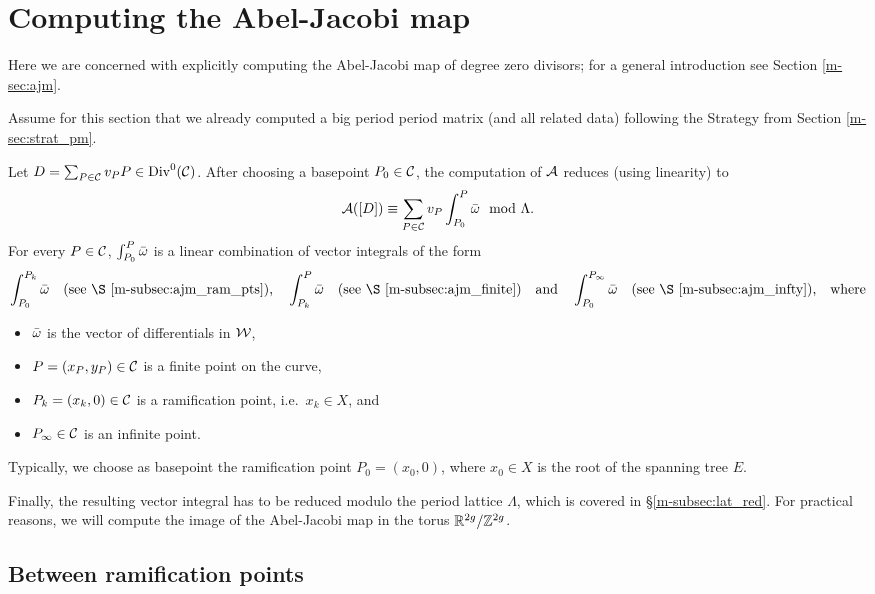 \documentclass[main.tex]{subfiles}
\begin{document}
  \section{Computing the Abel-Jacobi map}\label{sec:comp_ajm}
  
   Here we are concerned with explicitly computing the Abel-Jacobi map of degree zero divisors; for a general introduction see Section \ref{m-sec:ajm}.
   
   Assume for this section that we already computed a big period period matrix (and all related data) following the Strategy from Section \ref{m-sec:strat_pm}. 
   
   Let $D = \sum_{P \in \mathcal{C}} v_P P \in \operatorname{Div}^0(\mathcal{C})$. After choosing a basepoint $P_0 \in \mathcal{C}$, the computation of $\mathcal{A}$ reduces (using linearity) to
   \begin{equation*}
     \mathcal{A}([D]) \equiv \sum_{P \in \mathcal{C}} v_P \int_{P_0}^P \bar{\omega} \mod \Lambda.
   \end{equation*}
  For every $P \in \mathcal{C}$, $\int_{P_0}^P \bar{\omega}$ is a linear combination of vector integrals of the form
  \begin{align*}
    \int_{P_0}^{P_k} \bar\w\quad \text{(see \S \ref{m-subsec:ajm_ram_pts}),} \quad
    \int_{P_k}^{P} \bar\w \quad \text{(see \S \ref{m-subsec:ajm_finite})}
    \quad \text{and} \quad \int_{P_0}^{P_{\infty}} \bar\w\quad \text{(see \S \ref{m-subsec:ajm_infty}),} \quad \text{where}
  \end{align*}
  \begin{itemize}
   \item $\bar{\omega}$ is the vector of differentials in $\mathcal{W}$,
   \item $P = (x_P,y_P) \in \mathcal{C}$ is a finite point on the curve,
   \item $P_k = (x_k,0) \in \mathcal{C}$ is a ramification point, i.e.\ $x_k \in X$, and
   \item $P_{\infty} \in \mathcal{C}$ is an infinite point.
  \end{itemize}
  
   Typically, we choose as basepoint the ramification point $P_0 = (x_0,0)$, where $x_0 \in X$ is the root of the spanning tree $E$.
   
  Finally, the resulting vector integral has to be reduced modulo the period lattice $\Lambda$, which is covered in \S \ref{m-subsec:lat_red}. For practical reasons, we will compute the
  image of the Abel-Jacobi map in the torus $\mathbb{R}^{2g} / \mathbb{Z}^{2g}$.
  
  
  \subsection{Between ramification points}\label{subsec:ajm_ram_pts}
\end{document}
